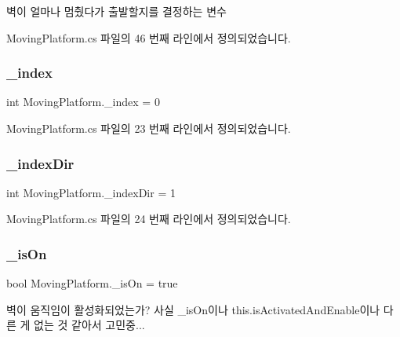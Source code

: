 벽이 얼마나 멈췄다가 출발할지를 결정하는 변수 



Moving\+Platform.\+cs 파일의 46 번째 라인에서 정의되었습니다.

\mbox{\label{class_moving_platform_a20948e50a50c338c4e62f84a633868ac}} 
\subsubsection{\texorpdfstring{\_index}{\_index}}
{\footnotesize\ttfamily int Moving\+Platform.\+\_\+index = 0\hspace{0.3cm}{\ttfamily [protected]}}



Moving\+Platform.\+cs 파일의 23 번째 라인에서 정의되었습니다.

\mbox{\label{class_moving_platform_a885973335ac91f8c34289d38f2d88d93}} 
\subsubsection{\texorpdfstring{\_indexDir}{\_indexDir}}
{\footnotesize\ttfamily int Moving\+Platform.\+\_\+index\+Dir = 1\hspace{0.3cm}{\ttfamily [private]}}



Moving\+Platform.\+cs 파일의 24 번째 라인에서 정의되었습니다.

\mbox{\label{class_moving_platform_a6721f91607e56294fb807a00ccfaafad}} 
\subsubsection{\texorpdfstring{\_isOn}{\_isOn}}
{\footnotesize\ttfamily bool Moving\+Platform.\+\_\+is\+On = true\hspace{0.3cm}{\ttfamily [private]}}

벽이 움직임이 활성화되었는가? 사실 \+\_\+is\+On이나 this.\+is\+Activated\+And\+Enable이나 다른 게 없는 것 같아서 고민중... 

